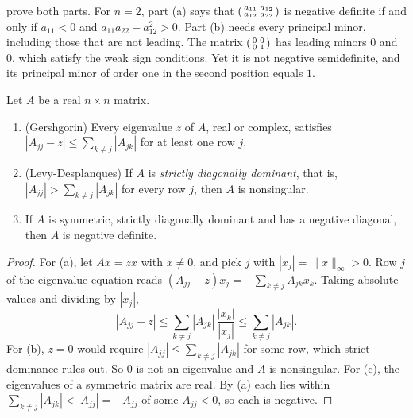  prove both parts. For $n = 2$, part (a) says that $\begin{psmallmatrix} a_{11} & a_{12} \\ a_{12} & a_{22}\end{psmallmatrix}$ is
negative definite if and only if $a_{11} < 0$ and $a_{11}a_{22} - a_{12}^2 > 0$. Part (b) needs every principal minor,
including those that are not leading. The matrix $\begin{psmallmatrix} 0 & 0 \\ 0 & 1\end{psmallmatrix}$ has leading minors $0$ and $0$, which
satisfy the weak sign conditions. Yet it is not negative semidefinite, and its principal minor of order one in the
second position equals $1$.

\begin{lemma}\label{lem:B-dd}
Let $A$ be a real $n \times n$ matrix.
\begin{enumerate}[label=(\alph*)]
  \item (Gershgorin) Every eigenvalue $z$ of $A$, real or complex, satisfies
  $|A_{jj} - z| \leq \sum_{k \neq j}|A_{jk}|$ for at least one row $j$.
  \item (Levy-Desplanques) If $A$ is \emph{strictly diagonally dominant}, that is,
  $|A_{jj}| > \sum_{k \neq j}|A_{jk}|$ for every row $j$, then $A$ is nonsingular.
  \item If $A$ is symmetric, strictly diagonally dominant and has a negative diagonal, then $A$ is negative definite.
\end{enumerate}
\end{lemma}

\begin{proof}
For (a), let $Ax = zx$ with $x \neq 0$, and pick $j$ with $|x_j| = \|x\|_\infty > 0$. Row $j$ of the eigenvalue equation
reads $(A_{jj} - z)x_j = -\sum_{k \neq j}A_{jk}x_k$. Taking absolute values and dividing by $|x_j|$,
\begin{equation*}
|A_{jj} - z| \leq \sum_{k \neq j}|A_{jk}|\,\frac{|x_k|}{|x_j|} \leq \sum_{k \neq j}|A_{jk}| .
\end{equation*}
For (b), $z = 0$ would require $|A_{jj}| \leq \sum_{k \neq j}|A_{jk}|$ for some row, which strict dominance rules
out. So $0$ is not an eigenvalue and $A$ is nonsingular. For (c), the eigenvalues of a symmetric matrix are real.
By (a) each lies within $\sum_{k \neq j}|A_{jk}| < |A_{jj}| = -A_{jj}$ of some $A_{jj} < 0$, so each is negative.
\end{proof}

